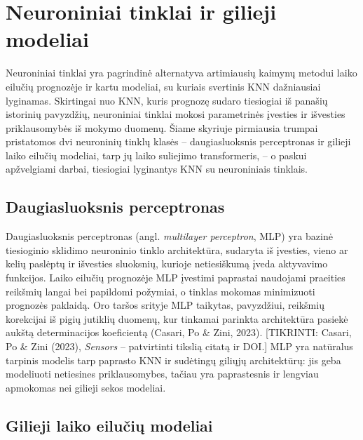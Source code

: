 \documentclass[]{VUMIFTemplateClass}
\begin{document}
    \section{Neuroniniai tinklai ir gilieji modeliai}

    Neuroniniai tinklai yra pagrindinė alternatyva artimiausių kaimynų metodui laiko eilučių prognozėje ir kartu modeliai, su kuriais svertinis KNN dažniausiai lyginamas. Skirtingai nuo KNN, kuris prognozę sudaro tiesiogiai iš panašių istorinių pavyzdžių, neuroniniai tinklai mokosi parametrinės įvesties ir išvesties priklausomybės iš mokymo duomenų. Šiame skyriuje pirmiausia trumpai pristatomos dvi neuroninių tinklų klasės -- daugiasluoksnis perceptronas ir gilieji laiko eilučių modeliai, tarp jų laiko suliejimo transformeris, -- o paskui apžvelgiami darbai, tiesiogiai lyginantys KNN su neuroniniais tinklais.

    \subsection{Daugiasluoksnis perceptronas}

    Daugiasluoksnis perceptronas (angl. \textit{multilayer perceptron}, MLP) yra bazinė tiesioginio sklidimo neuroninio tinklo architektūra, sudaryta iš įvesties, vieno ar kelių paslėptų ir išvesties sluoksnių, kurioje netiesiškumą įveda aktyvavimo funkcijos. Laiko eilučių prognozėje MLP įvestimi paprastai naudojami praeities reikšmių langai bei papildomi požymiai, o tinklas mokomas minimizuoti prognozės paklaidą. Oro taršos srityje MLP taikytas, pavyzdžiui,  reikšmių korekcijai iš pigių jutiklių duomenų, kur tinkamai parinkta architektūra pasiekė aukštą determinacijos koeficientą (Casari, Po \& Zini, 2023). [TIKRINTI: Casari, Po \& Zini (2023), \textit{Sensors} -- patvirtinti tikslią citatą ir DOI.] MLP yra natūralus tarpinis modelis tarp paprasto KNN ir sudėtingų giliųjų architektūrų: jis geba modeliuoti netiesines priklausomybes, tačiau yra paprastesnis ir lengviau apmokomas nei gilieji sekos modeliai.

    \subsection{Gilieji laiko eilučių modeliai}
\end{document}
